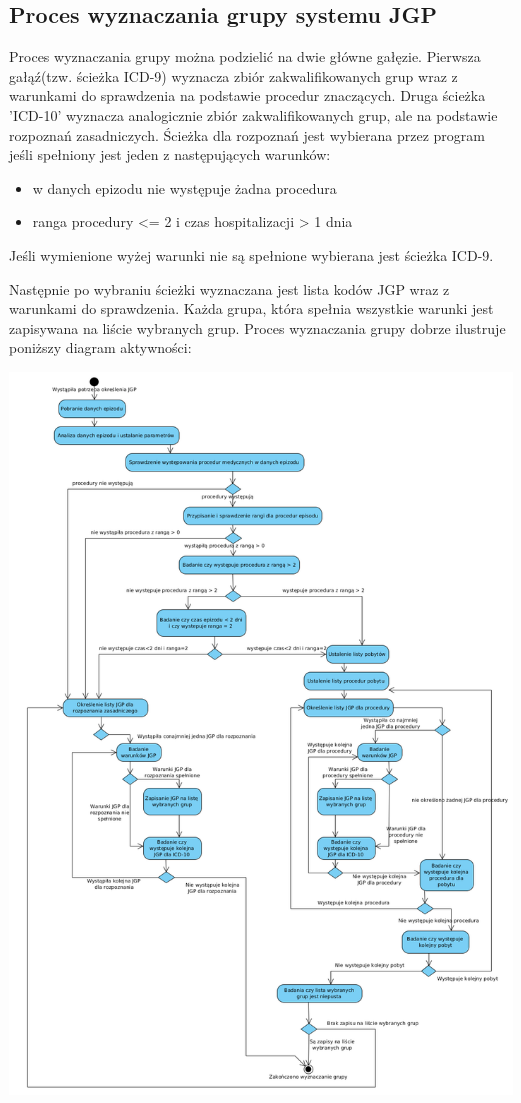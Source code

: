 \subsection{Proces wyznaczania grupy systemu JGP}
\label{sec:procesWyznaczaniaGrupySystemuJGP}
Proces wyznaczania grupy można podzielić na dwie główne gałęzie. Pierwsza gałąź(tzw. ścieżka ICD-9) wyznacza zbiór zakwalifikowanych grup wraz z warunkami do sprawdzenia na podstawie procedur znaczących. Druga ścieżka 'ICD-10' wyznacza analogicznie zbiór zakwalifikowanych grup, ale na podstawie rozpoznań zasadniczych. Ścieżka dla rozpoznań jest wybierana przez program jeśli spełniony jest jeden z następujących warunków:
\begin{itemize}
\item w danych epizodu nie występuje żadna procedura
\item ranga procedury <= 2 i czas hospitalizacji > 1 dnia
\end{itemize}
Jeśli wymienione wyżej warunki nie są spełnione wybierana jest ścieżka ICD-9.

Następnie po wybraniu ścieżki wyznaczana jest lista kodów JGP wraz z warunkami do sprawdzenia. Każda grupa, która spełnia wszystkie warunki jest zapisywana na liście wybranych grup. Proces wyznaczania grupy dobrze ilustruje poniższy diagram aktywności:

\includegraphics[scale=0.4]{images/activity-jgp} 

